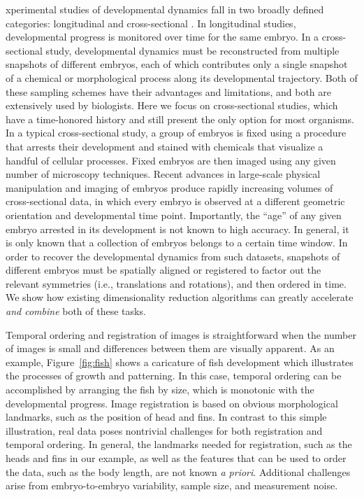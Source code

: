 \documentclass{pnastwo}
\begin{document}
\begin{article}
xperimental studies of developmental dynamics fall in two broadly defined categories: longitudinal and cross-sectional \cite{diggle2002analysis}.
%
In longitudinal studies, developmental progress is monitored over time for the same embryo.
%
In a cross-sectional study, developmental dynamics must be reconstructed from multiple snapshots of different embryos, each of which contributes only a single snapshot of a chemical or morphological process along its developmental trajectory.
%
Both of these sampling schemes have their advantages and limitations, and both are extensively used by biologists.
%
Here we focus on cross-sectional studies, which have a time-honored history and still present the only option for most organisms.
%
In a typical cross-sectional study, a group of embryos is fixed using a procedure that arrests their development and stained with chemicals that visualize a handful of cellular processes.
%
Fixed embryos are then imaged using any given number of microscopy techniques.
%
Recent advances in large-scale physical manipulation and imaging of embryos produce rapidly increasing volumes of cross-sectional data, in which every embryo is observed at a different geometric orientation and developmental time point.
%
Importantly, the ``age'' of any given embryo arrested in its development is not known to high accuracy.
%
In general, it is only known that a collection of embryos belongs to a certain time window.
%
In order to recover the developmental dynamics from such datasets, snapshots of different embryos must be spatially aligned or registered to factor out the relevant symmetries (i.e., translations and rotations), and then ordered in time.
%
We show how existing dimensionality reduction algorithms can greatly accelerate {\it and combine} both of these tasks.

Temporal ordering and registration of images is straightforward when the number of images is small and differences between them are visually apparent.
%
As an example, Figure~\ref{fig:fish} shows a caricature of fish development which illustrates the processes of growth and patterning.
%
In this case, temporal ordering can be accomplished by arranging the fish by size, which is monotonic with the developmental progress.
%
Image registration is based on obvious morphological landmarks, such as the position of head and fins.
%
In contrast to this simple illustration, real data poses nontrivial challenges for both registration and temporal ordering. 
%
In general, the landmarks needed for registration, such as the heads and fins in our example, as well as the features that can be used to order the data, such as the body length, are not known {\it a priori}.
%
Additional challenges arise from embryo-to-embryo variability, sample size, and measurement noise. 


\end{article}
\end{document}
